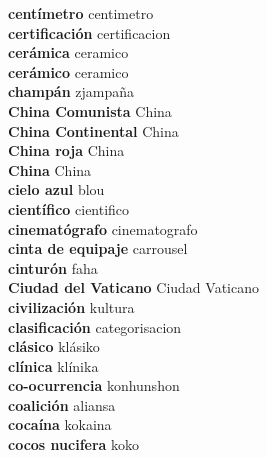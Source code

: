 \textbf{ centímetro  } centimetro \\
\textbf{ certificación  } certificacion \\
\textbf{ cerámica  } ceramico \\
\textbf{ cerámico  } ceramico \\
\textbf{ champán  } zjampaña \\
\textbf{ China Comunista  } China \\
\textbf{ China Continental  } China \\
\textbf{ China roja  } China \\
\textbf{ China  } China \\
\textbf{ cielo azul  } blou \\
\textbf{ científico  } cientifico \\
\textbf{ cinematógrafo  } cinematografo \\
\textbf{ cinta de equipaje  } carrousel \\
\textbf{ cinturón  } faha \\
\textbf{ Ciudad del Vaticano  } Ciudad Vaticano \\
\textbf{ civilización  } kultura \\
\textbf{ clasificación  } categorisacion \\
\textbf{ clásico  } klásiko \\
\textbf{ clínica  } klínika \\
\textbf{ co-ocurrencia  } konhunshon \\
\textbf{ coalición  } aliansa \\
\textbf{ cocaína  } kokaina \\
\textbf{ cocos nucifera  } koko \\

